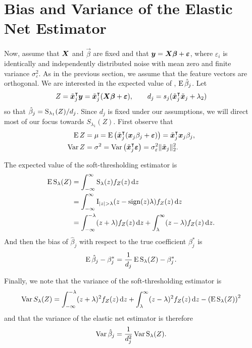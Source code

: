 \section{Bias and Variance of the Elastic Net Estimator}

Now, assume that \(\boldsymbol{X}\) and \(\vec{\beta}\) are fixed and that \(\boldsymbol{y} = \boldsymbol{X}\boldsymbol{\beta} + \boldsymbol{\varepsilon}\), where \(\varepsilon_i\) is identically and independently distributed noise with mean zero and finite variance \(\sigma_\varepsilon^2\). As in the previous section, we assume that the feature vectors are orthogonal. We are interested in the expected value of , \(\operatorname{E} \hat{\beta}_j\). Let
\[
  Z = \tilde{\boldsymbol{x}}_j^\intercal \boldsymbol{y} = \tilde{\boldsymbol{x}}_j^\intercal(\boldsymbol{X}\boldsymbol{\beta} + \boldsymbol{\varepsilon}),
  \qquad
  d_j = s_j(\tilde{\boldsymbol{x}}_j^\intercal \tilde{\boldsymbol{x}}_j + \lambda_2)
\]
so that \(\hat{\beta}_j = \operatorname{S}_{\lambda_1}(Z)/d_j\). Since \(d_j\) is fixed under our assumptions, we will direct most of our focus towards \(S_{\lambda_1}(Z)\). First observe that
\begin{align*}
  \operatorname{E} Z   & = \mu = \operatorname{E} \left( \tilde{\boldsymbol{x}}_j^\intercal (\boldsymbol{x}_j\beta_j + \boldsymbol{\varepsilon}) \right)  = \tilde{\boldsymbol{x}}_j^\intercal\boldsymbol{x}_j \beta_j,  \\
  \operatorname{Var} Z & = \sigma^2 = \operatorname{Var}\left(\tilde{\boldsymbol{x}}_j ^\intercal \boldsymbol{\varepsilon}\right) = \sigma_\varepsilon^2 \lVert \tilde{\boldsymbol{x}}_j\rVert_2^2.
\end{align*}

The expected value of the soft-thresholding estimator is
\begin{align*}
  \label{eq:st-expected-value}
  \operatorname{E} \operatorname{S}_\lambda(Z) & = \int_{-\infty}^\infty \operatorname{S}_\lambda(z) f_Z(z) \mathop{}\!\mathrm{d} z                                                   \nonumber \\
                    & = \int_{-\infty}^\infty \operatorname{I}_{|z| > \lambda} (z -\operatorname{sign}(z)\lambda) f_Z(z) \mathop{}\!\mathrm{d} z                         \nonumber \\
                    & = \int_{-\infty}^{-\lambda}(z + \lambda)f_Z(z) \mathop{}\!\mathrm{d} z + \int_{\lambda}^\infty (z - \lambda)f_Z(z) \mathop{}\!\mathrm{d} z.
\end{align*}
And then the bias of \(\hat\beta_j\) with respect to the true coefficient \(\beta_j^*\) is
\begin{equation*}
  \label{eq:betahat-bias}
  \operatorname{E} \hat\beta_j - \beta_j^* = \frac{1}{d_j}\operatorname{E} \operatorname{S}_\lambda(Z) - \beta^*_j.
\end{equation*}

Finally, we note that the variance of the soft-thresholding estimator is
\begin{equation}
  \label{eq:st-variance}
  \operatorname{Var} {S_\lambda(Z)} = \int_{-\infty}^{-\lambda}(z + \lambda)^2f_Z(z) \mathop{}\!\mathrm{d} z + \int_{\lambda}^\infty (z - \lambda)^2 f_Z(z) \mathop{}\!\mathrm{d} z - \left(\operatorname{E} \operatorname{S}_\lambda(Z)\right)^2
\end{equation}
and that the variance of the elastic net estimator is therefore
\begin{equation}
  \label{eq:betahat-variance}
  \operatorname{Var} \hat\beta_j = \frac{1}{d_j^2} \operatorname{Var} \operatorname{S}_\lambda(Z).
\end{equation}

